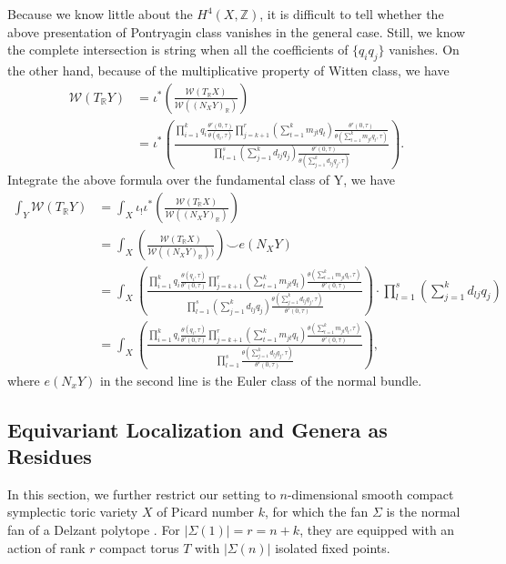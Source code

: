 \documentclass[11pt]{article}
\newcommand{\reals}{\mathbb R}
\newcommand{\intg}{\mathbb Z}
\begin{document}
Because we know little about the $H^4(X,\intg)$, it is difficult to tell whether the above presentation of Pontryagin class vanishes in the general case. Still, we know the complete intersection is string when all the coefficients of $\{q_i q_j\}$ vanishes. On the other hand, because of the multiplicative property of Witten class, we have
\begin{equation*}
\begin{aligned}
\mathcal{W}(T_\reals Y)
&=\iota^*\left(\frac{\mathcal{W}(T_\reals X)}{\mathcal{W}((N_X Y)_\reals)}\right)\\
&=\iota^*\left(\frac{\prod_{i=1}^k q_i \frac{\theta'(0,\tau)}{\theta(q_i,\tau)}\prod_{j=k+1}^r (\sum_{t=1}^k m_{j t}q_t) \frac{\theta'(0,\tau)}{\theta(\sum_{t=1}^k m_{jt}q_t,\tau)}}{\prod_{l=1}^s(\sum_{j=1}^k d_{l j} q_j) \frac{\theta'(0,\tau)}{\theta(\sum_{j=1}^k d_{l j} q_j,\tau)}}\right).
\end{aligned}
\end{equation*}
Integrate the above formula over the fundamental class of Y, we have
$$
\begin{aligned}
\int_{Y} \mathcal{W}(T_\reals Y) 
& =\int_X \iota_!\iota^*\left(\frac{\mathcal{W}(T_\reals X)}{\mathcal{W}((N_X Y)_\reals)}\right)\\
& =\int_X \left(\frac{\mathcal{W}(T_\reals X)}{\mathcal{W}((N_X Y)_\reals))}\right)\smile e(N_X Y)\\
& =\int_X \left(\frac{\prod_{i=1}^k q_i \frac{\theta(q_i,\tau)}{\theta'(0,\tau)}\prod_{j=k+1}^r (\sum_{t=1}^k m_{j t}q_t) \frac{\theta(\sum_{t=1}^k m_{jt}q_t,\tau)}{\theta'(0,\tau)}}{\prod_{l=1}^s(\sum_{j=1}^k d_{l j} q_j) \frac{\theta(\sum_{j=1}^k d_{l j} q_j,\tau)}{\theta'(0,\tau)}}\right)\cdot \prod_{l=1}^s(\sum_{j=1}^k d_{l j} q_j)\\
& =\int_X \left(\frac{\prod_{i=1}^k q_i \frac{\theta(q_i,\tau)}{\theta'(0,\tau)}\prod_{j=k+1}^r (\sum_{t=1}^k m_{jt}q_t) \frac{\theta(\sum_{t=1}^k m_{jt}q_t,\tau)}{\theta'(0,\tau)}}{\prod_{l=1}^s \frac{\theta(\sum_{j=1}^k d_{l j} q_j,\tau)}{\theta'(0,\tau)}}\right),
\end{aligned}
$$
where $e(N_x Y)$ in the second line is the Euler class of the normal bundle.
\subsection{Equivariant Localization and Genera as Residues}
In this section, we further restrict our setting to $n$-dimensional smooth compact symplectic toric variety $X$ of Picard number $k$, for which the fan $\Sigma$ is the normal fan of a Delzant polytope \cite{da2001symplectic}. For $|\Sigma(1)|=r=n+k$, they are equipped with an action of rank $r$ compact torus $T$ with $|\Sigma(n)|$ isolated fixed points.
 
\end{document}
